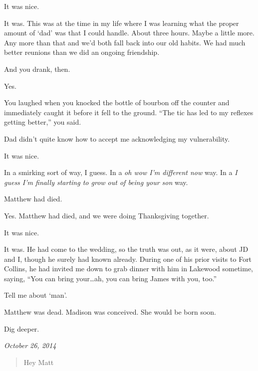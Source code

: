 \begin{paracol}{2}
\begin{leftcolumn}
\begin{ally}
It was nice.
\end{ally}
It was. This was at the time in my life where I was learning what the proper amount of `dad' was that I could handle. About three hours. Maybe a little more. Any more than that and we'd both fall back into our old habits. We had much better reunions than we did an ongoing friendship.

\begin{ally}
And you drank, then.
\end{ally}
Yes.

\begin{ally}
You laughed when you knocked the bottle of bourbon off the counter and immediately caught it before it fell to the ground. ``The tic has led to my reflexes getting better,'' you said.
\end{ally}
Dad didn't quite know how to accept me acknowledging my vulnerability.

\begin{ally}
It was nice.
\end{ally}
In a smirking sort of way, I guess. In a \emph{oh wow I'm different now} way. In a \emph{I guess I'm finally starting to grow out of being your son} way.

\begin{ally}
Matthew had died.
\end{ally}
Yes. Matthew had died, and we were doing Thanksgiving together.

\begin{ally}
It was nice.
\end{ally}
It was. He had come to the wedding, so the truth was out, as it were, about JD and I, though he surely had known already. During one of his prior visits to Fort Collins, he had invited me down to grab dinner with him in Lakewood sometime, saying, ``You can bring your\ldots{}ah, you can bring James with you, too.''

\begin{ally}
Tell me about `man'.
\end{ally}
Matthew was dead. Madison was conceived. She would be born soon.

\begin{ally}
Dig deeper.
\end{ally}
\newpage
\end{leftcolumn}
\begin{rightcolumn*}
\emph{October 26, 2014}
\end{rightcolumn*}
\begin{leftcolumn}
\begin{quotation}
\noindent Hey Matt


\end{quotation}
\end{leftcolumn}
\end{paracol}
